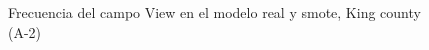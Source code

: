 \begin{figure}[H]
    \centering
    
    \caption{Frecuencia del campo View en el modelo real y smote, King county (A-2)}
    \label{frecuency-smote-view}
\end{figure}